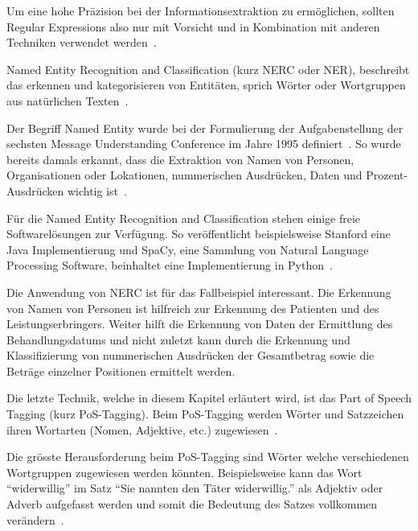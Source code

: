 Um eine hohe Präzision bei der Informationsextraktion zu ermöglichen, sollten Regular Expressions also nur mit Vorsicht und in Kombination mit anderen Techniken verwendet werden~\autocite{Xiao2004}.

Named Entity Recognition and Classification (kurz NERC oder NER), beschreibt das erkennen und kategorisieren von Entitäten, sprich Wörter oder Wortgruppen aus natürlichen Texten~\autocite{Nadeau2007}.

Der Begriff Named Entity wurde bei der Formulierung der Aufgabenstellung der sechsten Message Understanding Conference im Jahre 1995 definiert~\autocite{Borthwick1998}. So wurde bereits damals erkannt, dass die Extraktion von Namen von Personen, Organisationen oder Lokationen, nummerischen Ausdrücken, Daten und Prozent-Ausdrücken wichtig ist~\autocite{Nadeau2007}.

Für die Named Entity Recognition and Classification stehen einige freie Softwarelösungen zur Verfügung. So veröffentlicht beispielsweise Stanford eine Java Implementierung und SpaCy, eine Sammlung von Natural Language Processing Software, beinhaltet eine Implementierung in Python~\autocite{StanfordNLPGroup, ExplosionAI}.

Die Anwendung von NERC ist für das Fallbeispiel interessant. Die Erkennung von Namen von Personen ist hilfreich zur Erkennung des Patienten und des Leistungserbringers. Weiter hilft die Erkennung von Daten der Ermittlung des Behandlungsdatums und nicht zuletzt kann durch die Erkennung und Klassifizierung von nummerischen Ausdrücken der Gesamtbetrag sowie die Beträge einzelner Positionen ermittelt werden.

Die letzte Technik, welche in diesem Kapitel erläutert wird, ist das Part of Speech Tagging (kurz PoS-Tagging). Beim PoS-Tagging werden Wörter und Satzzeichen ihren Wortarten (Nomen, Adjektive, etc.) zugewiesen~\autocite{Xiao2004}.

Die grösste Herausforderung beim PoS-Tagging sind Wörter welche verschiedenen Wortgruppen zugewiesen werden könnten. Beispielsweise kann das Wort \enquote{widerwillig} im Satz \enquote{Sie nannten den Täter widerwillig.} als Adjektiv oder Adverb aufgefasst werden und somit die Bedeutung des Satzes vollkommen verändern~\autocite{Volk}.


